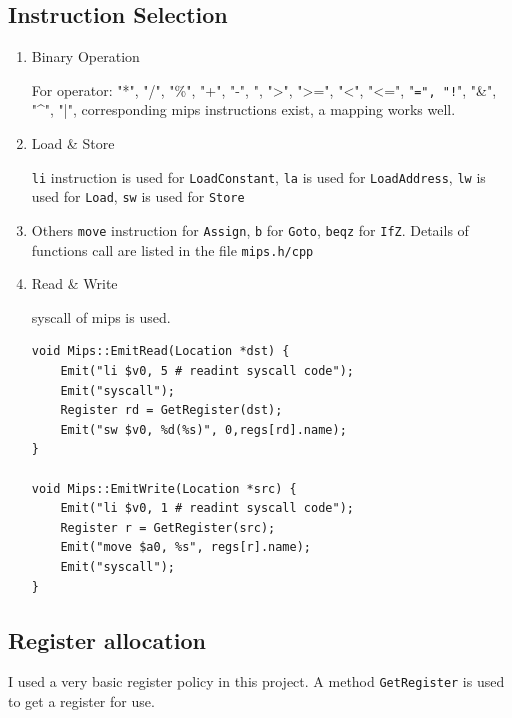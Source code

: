 \documentclass[11pt]{article}
\begin{document}
\subsection{Instruction Selection}
\label{sec:orgheadline28}
\begin{enumerate}
\item Binary Operation

 For operator: "*", "/", "\%", "+", "-", \label{orgtarget1}", ">", ">=", "<", "<=",
"\texttt{=", "!}", "\&", "\^{}", "|", corresponding mips instructions exist, a mapping
 works well.

\item Load \& Store

\texttt{li} instruction is used for \texttt{LoadConstant}, \texttt{la} is used for
\texttt{LoadAddress}, \texttt{lw} is used for \texttt{Load}, \texttt{sw} is used for \texttt{Store}

\item Others
\texttt{move} instruction for \texttt{Assign}, \texttt{b} for \texttt{Goto}, \texttt{beqz} for \texttt{IfZ}. Details
of functions call are listed in the file \texttt{mips.h/cpp}

\item Read \& Write

syscall of mips is used.
\begin{verbatim}
void Mips::EmitRead(Location *dst) {
    Emit("li $v0, 5 # readint syscall code");
    Emit("syscall");
    Register rd = GetRegister(dst);
    Emit("sw $v0, %d(%s)", 0,regs[rd].name);
}

void Mips::EmitWrite(Location *src) {
    Emit("li $v0, 1 # readint syscall code");
    Register r = GetRegister(src);
    Emit("move $a0, %s", regs[r].name);
    Emit("syscall");
}
\end{verbatim}
\end{enumerate}

\subsection{Register allocation}
\label{sec:orgheadline29}
I used a very basic register policy in this project. A method \texttt{GetRegister}
is used to get a register for use.
\end{document}
